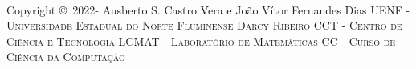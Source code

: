 \newpage
~\vfill
\thispagestyle{empty}

\noindent Copyright \copyright\ 2022-\the\year{} Ausberto S. Castro Vera e João Vítor Fernandes Dias  %
\noindent \textsc{UENF - Universidade Estadual do Norte Fluminense Darcy Ribeiro} %
\noindent \textsc{CCT - Centro de Ciência e Tecnologia} %
\noindent \textsc{LCMAT - Laboratório de Matemáticas} %
\noindent \textsc{CC - Curso de Ciência da Computação} %


